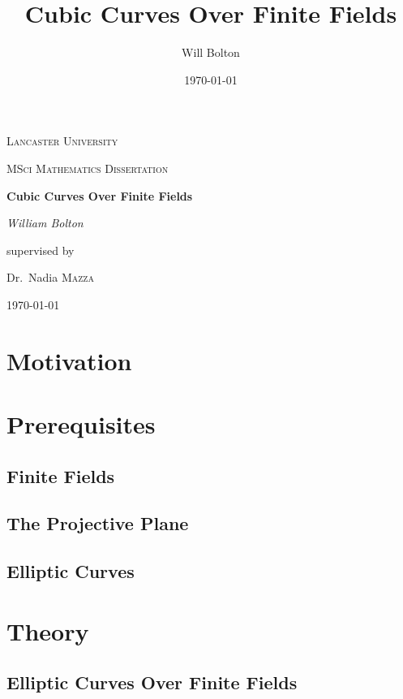 \documentclass[a4paper,12pt,titlepage,oneside]{article}
\title{Cubic Curves Over Finite Fields}
\author{Will Bolton}
\date{\today}
\begin{document}
\begin{titlepage}
	\centering
	{\scshape\LARGE Lancaster University \par}
	\vspace{1cm}
	{\scshape\Large MSci Mathematics Dissertation\par}
	\vspace{1.5cm}
	{\huge\bfseries Cubic Curves Over Finite Fields\par}
	\vspace{2cm}
	{\Large\itshape William Bolton\par}
	\vfill
	supervised by\par
	Dr.~Nadia \textsc{Mazza}

	\vfill

	{\large \today\par}
\end{titlepage}
\tableofcontents
\clearpage

\section*{Motivation}

\nocite{*}
\clearpage

\section{Prerequisites}
\subsection{Finite Fields}

\subsection{The Projective Plane}

\subsection{Elliptic Curves}

\clearpage

\section{Theory}
\subsection{Elliptic Curves Over Finite Fields}

\end{document}
